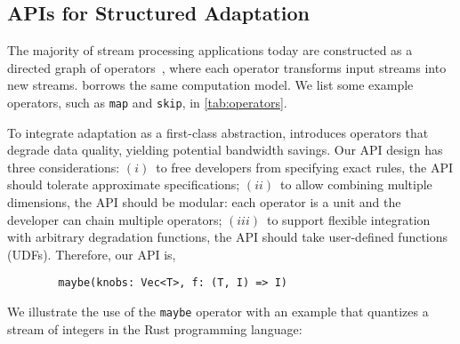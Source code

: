 \subsection{APIs for Structured Adaptation}
\label{sec:struct-adapt}

The majority of stream processing applications today are constructed as a
directed graph of operators~\cite{toshniwal2014storm, zaharia2013discretized},
where each operator transforms input streams into new streams. \sysname{}
borrows the same computation model. We list some example operators, such as
\texttt{map} and \texttt{skip}, in \autoref{tab:operators}.

To integrate adaptation as a first-class abstraction, \sysname{} introduces \maybe{} operators
that degrade data quality, yielding potential bandwidth savings.
Our API design has three considerations:
$(i)$~to free developers from specifying exact rules, the API should tolerate
approximate specifications; $(ii)$~to allow combining multiple dimensions, the API
should be modular: each operator is a unit and the developer can chain multiple
operators; $(iii)$~to support flexible integration with arbitrary degradation
functions, the API should take user-defined functions (UDFs). Therefore, our API
is,

\vspace{-2pt}
\begin{lstlisting}
        maybe(knobs: Vec<T>, f: (T, I) => I)
\end{lstlisting}

We illustrate the use of the \texttt{maybe} operator with an example that
quantizes a stream of integers in the Rust programming language:


